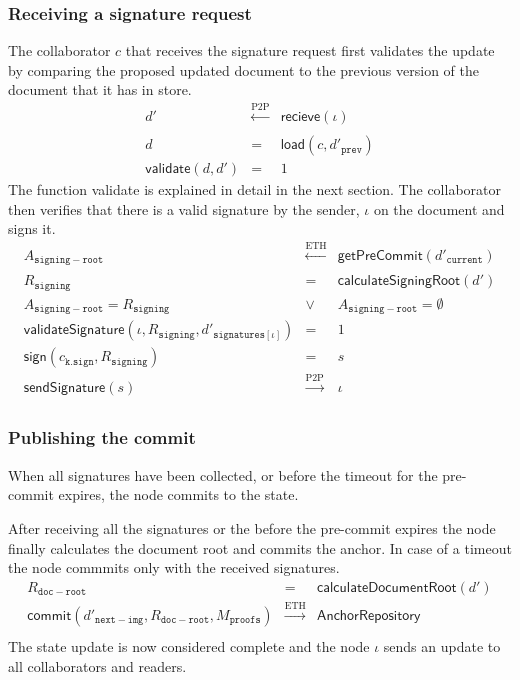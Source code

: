 \subsubsection{Receiving a signature request}
The collaborator $c$ that receives the signature request first validates the update by comparing the proposed updated document to the previous version of the document that it has in store. 
\begin{eqnarray}
   d' & \xleftarrow[]{\text{P2P}} & \mathsf{recieve}(\iota) \\
    d & = &\mathsf{load}(c, {d'}_{\mathtt{prev}}) \\
    \mathsf{validate}(d, d') & = & 1 
\end{eqnarray}
The function \textsf{validate} is explained in detail in the next section.
The collaborator then verifies that there is a valid signature by the sender, $\iota$ on the document and signs it.\\
\begin{eqnarray}
    A_{\mathtt{signing-root}} & \xleftarrow[]{\text{ETH}} & \mathsf{getPreCommit}(d'_{\mathtt{current}}) \\
    R_{\mathtt{signing}} & = & \mathsf{calculateSigningRoot}(d')\\
    A_{\mathtt{signing-root}} = R_{\mathtt{signing}} &\lor & A_{\mathtt{signing-root}} = \emptyset \\
    \mathsf{validateSignature}(\iota, R_{\mathtt{signing}}, {d'}_{\mathtt{signatures}[\iota]}) & = & 1\\
    \mathsf{sign}(c_{\mathtt{k.sign}}, R_{\mathtt{signing}}) & = & s \\
    \mathsf{sendSignature}(s) &\xrightarrow[]{\text{P2P}}& \iota
\end{eqnarray}

\subsubsection{Publishing the commit}

When all signatures have been collected, or before the timeout for the pre-commit expires, the node commits to the state. 

After receiving all the signatures or the before the pre-commit expires the node finally calculates the document root and commits the anchor.  In case of a timeout the node commmits only with the received signatures.
\begin{eqnarray}
R_{\mathtt{doc-root}} & = & \mathsf{calculateDocumentRoot}(d')\\
  \mathsf{commit}(d'_{\mathtt{next-img}}, R_{\mathtt{doc-root}},M_{\texttt{proofs}}) &\xrightarrow[]{\text{ETH}}& \mathsf{AnchorRepository}\\ 
  \end{eqnarray}
The state update is now considered complete and the node $\iota$ sends an update to all collaborators and readers.

